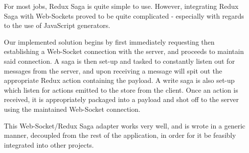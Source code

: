 \documentclass{standalone}
\begin{document}
			For most jobs, Redux Saga is quite simple to use. However, integrating Redux Saga with Web-Sockets proved to be quite complicated - especially with regards to the use of JavaScript generators.

			Our implemented solution begins by first immediately requesting then establishing a Web-Socket connection with the server, and proceeds to maintain said connection. A saga is then set-up and tasked to constantly listen out for messages from the server, and upon receiving a message will spit out the appropriate Redux action containing the payload. A write saga is also set-up which listen for actions emitted to the store from the client. Once an action is received, it is appropriately packaged into a payload and shot off to the server using the maintained Web-Socket connection.

			This Web-Socket/Redux Saga adapter works very well, and is wrote in a generic manner, decoupled from the rest of the application, in order for it be feasibly integrated into other projects.
\end{document}
